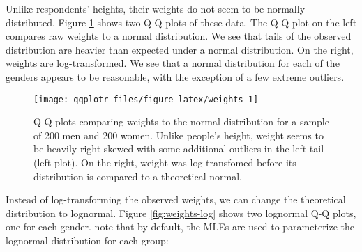 Unlike respondents' heights, their weights do not seem to be normally
distributed. Figure \ref{fig:weights} shows two Q-Q plots of these data.
The Q-Q plot on the left compares raw weights to a normal distribution.
We see that tails of the observed distribution are heavier than expected
under a normal distribution. On the right, weights are log-transformed.
We see that a normal distribution for each of the genders appears to be
reasonable, with the exception of a few extreme outliers.

\begin{Schunk}
\begin{figure}

{\centering \texttt{[image: qqplotr\_files/figure-latex/weights-1]} 

}

\caption[Q-Q plots comparing weights to the normal distribution for a sample of 200 men and 200 women]{Q-Q plots comparing weights to the normal distribution for a sample of 200 men and 200 women. Unlike people's height, weight seems to be heavily right skewed with some additional outliers in the left tail (left plot). On the right, weight was log-transfomed before its distribution is compared to a theoretical normal. }\label{fig:weights}
\end{figure}
\end{Schunk}

Instead of log-transforming the observed weights, we can change the
theoretical distribution to lognormal. Figure \ref{fig:weights-log}
shows two lognormal Q-Q plots, one for each gender. note that by
default, the MLEs are used to parameterize the lognormal distribution
for each group:

